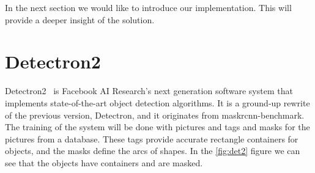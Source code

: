 

In the next section we would like to introduce our implementation. This will provide a deeper insight of the solution.

\section{Detectron2}
Detectron2~\cite{detectron2} is Facebook AI Research's next generation software system that implements state-of-the-art object detection algorithms. It is a ground-up rewrite of the previous version, Detectron, and it originates from maskrcnn-benchmark. The training of the system will be done with pictures and tags and masks for the pictures from a database. These tags provide accurate rectangle containers for objects, and the masks define the arcs of shapes. In the \ref{fig:det2} figure we can see that the objects have containers and are masked.


